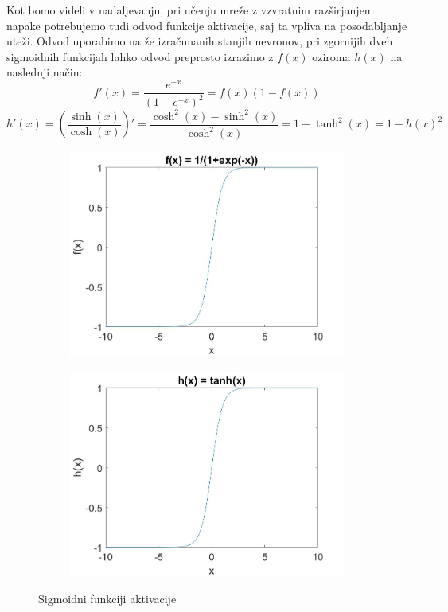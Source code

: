 \documentclass[mat1]{fmfdelo}
\begin{document}
Kot bomo videli v nadaljevanju, pri učenju mreže z vzvratnim razširjanjem napake potrebujemo tudi odvod funkcije aktivacije, saj ta vpliva na posodabljanje uteži. Odvod uporabimo na že izračunanih stanjih nevronov, pri zgornijih dveh sigmoidnih funkcijah lahko odvod preprosto izrazimo z $f(x)$ oziroma $h(x)$ na naslednji način:
%
\begin{equation}
f'(x) = \frac{e^{-x}}{(1+e^{-x})^2} = f(x)(1-f(x))
\end{equation}
%
\begin{equation}
h'(x) = \left(\frac{\sinh(x)}{\cosh(x)}\right)' = \frac{\cosh^2(x)- \sinh^2(x)}{\cosh^2(x)} = 1 - \tanh^2(x) = 1 - h(x)^2 
\end{equation}
%
\begin{figure}[!th]
\centering
\begin{subfigure}{.5\textwidth}
  \centering
  \includegraphics[width=.9\linewidth]{sig_exp.jpg}
\end{subfigure}%
\begin{subfigure}{.5\textwidth}
  \centering
  \includegraphics[width=.9\linewidth]{sig_tan.jpg}
\end{subfigure}
\caption{Sigmoidni funkciji aktivacije}
\label{fig:sigmoid}
\end{figure}
%
\end{document}
